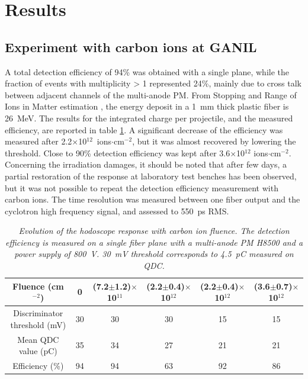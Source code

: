 \documentclass[a4paper,11pt]{article}
\begin{document}
\section{Results}
\subsection{Experiment with carbon ions at GANIL}
A total detection efficiency of 94\% was obtained with a single plane, while the fraction of events with multiplicity > 1 represented 24\%, mainly due to cross talk between adjacent channels of the multi-anode PM.
From Stopping and Range of Ions in Matter estimation \cite{Ziegler2010}, the energy deposit in a 1~mm thick plastic fiber is 26~MeV. The results for the integrated charge per projectile, and the measured efficiency, are reported in table \ref{tab:GANIL}. A significant decrease of the efficiency was measured after 2.2$\times$10$^{12}$~ions$\cdot$cm$^{-2}$, but it was almost recovered by lowering the threshold. 
Close to 90\% detection efficiency was kept after 3.6$\times$10$^{12}$ ions$\cdot$cm$^{-2}$.
Concerning the irradiation damages, it should be noted that after few days, a partial restoration of the response at laboratory test benches has been observed, but it was not possible to repeat the detection efficiency measurement with carbon ions. 
The time resolution was measured between one fiber output and the cyclotron high frequency signal, and assessed to 550~ps RMS. 
\begin{table}[H]
\centering
\begin{tabular}{|c|c|c|c|c|c|}
\hline
Fluence (cm$^{-2}$)& 0 & (7.2$\pm$1.2)$\times$10$^{11}$ & (2.2$\pm$0.4)$\times$10$^{12}$ & (2.2$\pm$0.4)$\times$10$^{12}$ & (3.6$\pm$0.7)$\times$10$^{12}$\\
\hline
\makecell{Discriminator\\threshold (mV)} & 30 & 30 & 30 & 15 & 15\\
\hline
\makecell{Mean QDC\\value (pC)} & 35 & 34 & 27 & 21 & 21\\
\hline
Efficiency (\%) & 94 & 94 & 63 & 92 & 86\\
\hline
\end{tabular}
\caption{\small{\textit{Evolution of the hodoscope response with carbon ion fluence. The detection efficiency is measured on a single fiber plane with a multi-anode PM H8500 and a power supply of 800~V. 30~mV threshold corresponds to 4.5~pC measured on QDC.}}}
\label{tab:GANIL}
\end{table}
\end{document}
